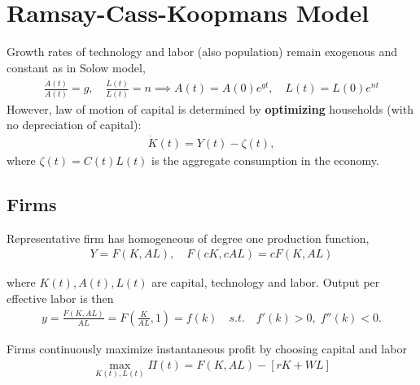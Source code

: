 \documentclass[../main.tex]{subfiles}
\begin{document}
        
    \chapter{Ramsay-Cass-Koopmans Model}
        
        Growth rates of technology and labor (also population) remain exogenous and constant as in Solow model,
        \begin{align}
            \frac{\dot A(t)}{A(t)} = g, \quad \frac{\dot L(t)}{L(t)} = n
            \implies
            A(t) = A(0)e^{gt}, \quad L(t) = L(0)e^{nt}
        \end{align}
        However, law of motion of capital is determined by \textbf{optimizing} households (with no depreciation of capital):
        \begin{align}
            \dot K(t) = Y(t) - \zeta(t),
        \end{align}
        where $\zeta(t) = C(t)L(t)$ is the aggregate consumption in the economy.
        
    \section{Firms}
    
        Representative firm has homogeneous of degree one production function,
        \begin{align}
            Y = F (K, A L),
            \quad
            F(c K, c A L)
            = c F(K, A L)
        \end{align}
        
        where $K(t), A(t), L(t)$ are capital, technology and labor. Output per effective labor is then
        \begin{align}
            y
            = \frac{F(K, AL)}{AL}
            = F\left(\frac{K}{AL}, 1\right)
            = f(k)
            \quad s.t. \quad f'(k) > 0,\; f''(k) < 0.
        \end{align}
        
        Firms continuously maximize instantaneous profit by choosing capital and labor
        \begin{align}
            \max_{K(t), L(t)} \Pi(t)
            = F(K, A L) - [r K + W L ]
        \end{align}
        
\end{document}
